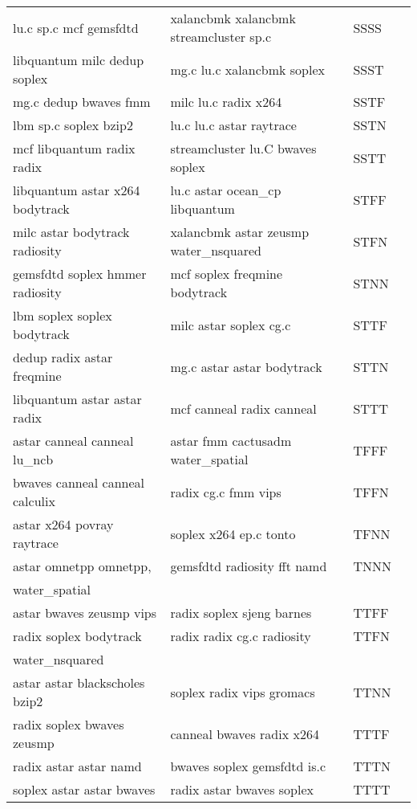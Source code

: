 \begin{table}[htb]
{\begin{tabular}{@{}lllr@{}}
lu.c sp.c mcf gemsfdtd                      	& xalancbmk xalancbmk streamcluster sp.c           & SSSS \\
libquantum milc dedup soplex                	& mg.c lu.c xalancbmk soplex           & SSST \\
mg.c dedup bwaves fmm                       	& milc lu.c radix x264           & SSTF \\
lbm sp.c soplex bzip2                       	&  lu.c lu.c astar raytrace          & SSTN \\
mcf libquantum radix radix                  	& streamcluster lu.C bwaves soplex         & SSTT \\
libquantum astar x264 bodytrack             	& lu.c astar ocean\_cp libquantum           & STFF \\
milc astar bodytrack radiosity              	& xalancbmk astar zeusmp water\_nsquared           & STFN \\
gemsfdtd soplex hmmer radiosity             	& mcf soplex freqmine bodytrack           & STNN \\
lbm soplex soplex bodytrack                 	& milc astar soplex cg.c           & STTF \\
dedup radix astar freqmine                  	& mg.c astar astar bodytrack           & STTN \\
libquantum astar astar radix                	& mcf canneal radix canneal           & STTT \\
astar canneal canneal lu\_ncb               	& astar fmm cactusadm water\_spatial           & TFFF \\
bwaves canneal canneal calculix             	& radix cg.c fmm vips           & TFFN \\
astar x264 povray raytrace                  	& soplex x264 ep.c tonto           & TFNN \\
astar omnetpp omnetpp,        	                & gemsfdtd radiosity fft namd           & TNNN \\
    \hspace*{8em}water\_spatial        	        &           &  \\
astar bwaves zeusmp vips                    	& radix soplex sjeng barnes           & TTFF \\
radix soplex bodytrack      	                & radix radix cg.c radiosity           & TTFN \\
        \hspace*{8em}water\_nsquared      	    &           &  \\
astar astar blackscholes bzip2              	& soplex radix vips gromacs          & TTNN \\
radix soplex bwaves zeusmp                  	& canneal bwaves radix x264           & TTTF \\
radix astar astar namd                      	& bwaves soplex gemsfdtd is.c          & TTTN \\
soplex astar astar bwaves                   	&  radix astar bwaves soplex          & TTTT \\

        \bottomrule
    \end{tabular}
}
    \label{tab: classes-AMD-Intel}
\end{table}
